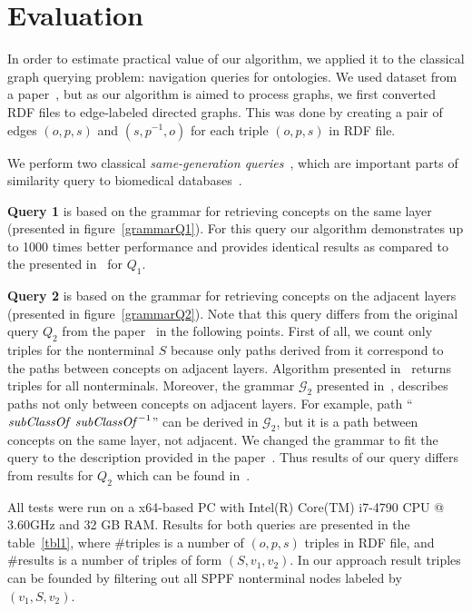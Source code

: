 \section{Evaluation}

In order to estimate practical value of our algorithm, we applied it to the classical graph querying problem: navigation queries for ontologies. 
We used dataset from a paper~\cite{CFGonRDF}, but as our algorithm is aimed to process graphs, we first converted RDF files to edge-labeled directed graphs.
This was done by creating a pair of edges $(o,p,s)$ and $(s,p^{-1},o)$ for each triple $(o,p,s)$ in RDF file.

We perform two classical \textit{same-generation queries}~\cite{FndDB}, which are important parts of similarity query to biomedical databases~\cite{GraphQueryWithEarley}.

\textbf{Query 1} is based on the grammar for retrieving concepts on the same layer (presented in figure~\ref{grammarQ1}).
For this query our algorithm demonstrates up to 1000 times better performance and provides identical results as compared to the presented in~\cite{CFGonRDF} for $Q_1$. 

\textbf{Query 2} is based on the grammar for retrieving concepts on the adjacent layers (presented in figure~\ref{grammarQ2}). 
Note that this query differs from the original query $Q_2$ from the paper~\cite{CFGonRDF} in the following points.
First of all, we count only triples for the nonterminal $S$ because only paths derived from it correspond to the paths between concepts on adjacent layers.
Algorithm presented in~\cite{CFGonRDF} returns triples for all nonterminals.
Moreover, the grammar $\mathcal{G}_2$ presented in~\cite{CFGonRDF}, describes paths not only between concepts on adjacent layers.
For example, path ``$\text{\textit{subClassOf} \textit{subClassOf}}^{-1}$'' can be derived in $\mathcal{G}_2$, but it is a path between concepts on the same layer, not adjacent.
We changed the grammar to fit the query to the description provided in the paper~\cite{CFGonRDF}. 
Thus results of our query differs from results for $Q_2$ which can be found in~\cite{CFGonRDF}.

All tests were run on a x64-based PC with Intel(R) Core(TM) i7-4790 CPU @ 3.60GHz and 32 GB RAM. 
Results for both queries are presented in the table~\ref{tbl1}, where \#triples is a number of $(o,p,s)$ triples in RDF file, and \#results is a number of triples of form $(S,v_1,v_2)$.
In our approach result triples can be founded by filtering out all SPPF nonterminal nodes labeled by $(v_1,S,v_2)$.

